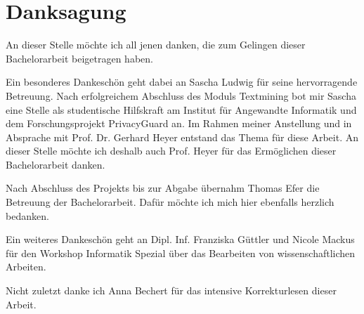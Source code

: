 \documentclass[11pt, a4paper, twoside, openright, final]{book}
\makeatletter
\numberwithin{equation}{chapter}		%
\renewcommand*{\cleardoublepage}{\clearpage\if@twoside \ifodd\c@page\else
\hbox{}%
\thispagestyle{empty}%
\newpage%
\if@twocolumn\hbox{}\newpage\fi\fi\fi}
\newcommand{\1}{\mathbbm{1}}
\makeatother
\begin{document}



\tableofcontents
\cleardoublepage


\setcounter{page}{1}	%










\cleardoublepage
\chapter*{Danksagung}
\label{c:acknowledgement}

An dieser Stelle möchte ich all jenen danken, die zum Gelingen dieser Bachelorarbeit beigetragen haben.

Ein besonderes Dankeschön geht dabei an Sascha Ludwig für seine hervorragende Betreuung. Nach erfolgreichem Abschluss des Moduls \glqq Textmining \grqq{} bot mir Sascha eine Stelle als studentische Hilfskraft am Institut für Angewandte Informatik und dem Forschungsprojekt \glqq PrivacyGuard \grqq{} an. Im Rahmen meiner Anstellung und in Absprache mit Prof. Dr. Gerhard Heyer entstand das Thema für diese Arbeit. An dieser Stelle möchte ich deshalb auch Prof. Heyer für das Ermöglichen dieser Bachelorarbeit danken.

Nach Abschluss des Projekts bis zur Abgabe übernahm Thomas Efer die Betreuung der Bachelorarbeit. Dafür möchte ich mich hier ebenfalls herzlich bedanken.

Ein weiteres Dankeschön geht an Dipl. Inf. Franziska Güttler und Nicole Mackus für den Workshop \glqq Informatik Spezial\grqq{} über das Bearbeiten von wissenschaftlichen Arbeiten.

Nicht zuletzt danke ich Anna Bechert für das intensive Korrekturlesen dieser Arbeit.



\listoffigures
\end{document}
